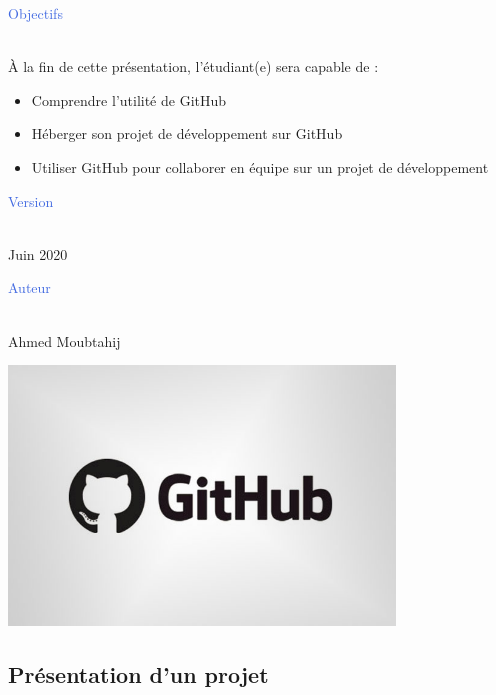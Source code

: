 \documentclass{article}
\begin{document}
\begin{flushleft}
\begin{Large}{\textcolor{RoyalBlue}{Objectifs}}\end{Large}\\
À la fin de cette présentation, l’étudiant(e) sera capable de :
\begin{itemize}
  \item Comprendre l'utilité de GitHub
  \item Héberger son projet de développement sur GitHub
  \item Utiliser GitHub pour collaborer en équipe sur un projet de développement
\end{itemize}

\end{flushleft}

\begin{flushleft}
\begin{large}{\textcolor{RoyalBlue}{Version}}\end{large}\\
Juin 2020
\end{flushleft}

\begin{flushleft}
\begin{large}{\textcolor{RoyalBlue}{Auteur}}\end{large}\\
Ahmed Moubtahij
\end{flushleft}

\newpage
\renewcommand*\contentsname{Table des matières}
\tableofcontents

\newpage
\includegraphics[width=0.77\textwidth, center]{Github_Logo}
\begin{center}\section{Présentation d'un projet}\end{center}
\end{document}
